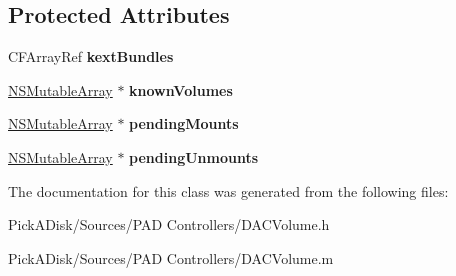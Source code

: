 \subsection*{Protected Attributes}
\begin{DoxyCompactItemize}
\item 
\hypertarget{interface_d_a_c_volume_service_a0afe89a9c0d72c22c80cca89652c2bcd}{
CFArrayRef {\bfseries kextBundles}}
\label{interface_d_a_c_volume_service_a0afe89a9c0d72c22c80cca89652c2bcd}

\item 
\hypertarget{interface_d_a_c_volume_service_a51394972132833b45f8e6aa5527d119b}{
\hyperlink{class_n_s_mutable_array}{NSMutableArray} $\ast$ {\bfseries knownVolumes}}
\label{interface_d_a_c_volume_service_a51394972132833b45f8e6aa5527d119b}

\item 
\hypertarget{interface_d_a_c_volume_service_a2cbb59eb93f6f26a84cceb27af904fba}{
\hyperlink{class_n_s_mutable_array}{NSMutableArray} $\ast$ {\bfseries pendingMounts}}
\label{interface_d_a_c_volume_service_a2cbb59eb93f6f26a84cceb27af904fba}

\item 
\hypertarget{interface_d_a_c_volume_service_a85e7af9403141b9ef6fa0a3a01f1dd59}{
\hyperlink{class_n_s_mutable_array}{NSMutableArray} $\ast$ {\bfseries pendingUnmounts}}
\label{interface_d_a_c_volume_service_a85e7af9403141b9ef6fa0a3a01f1dd59}

\end{DoxyCompactItemize}


The documentation for this class was generated from the following files:\begin{DoxyCompactItemize}
\item 
PickADisk/Sources/PAD Controllers/DACVolume.h\item 
PickADisk/Sources/PAD Controllers/DACVolume.m\end{DoxyCompactItemize}
